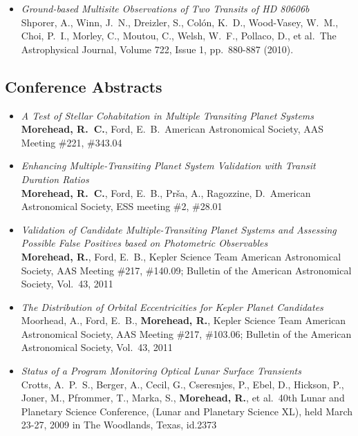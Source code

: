 \documentclass[12pt,letterpaper,sans]{moderncv} %
\begin{document}
\begin{itemize}
 \item \emph{ Ground-based Multisite Observations of Two Transits of HD 
80606b } \\ Shporer, A., Winn, J.~N., Dreizler, S., Col{\'o}n, K.~D., 
Wood-Vasey, W.~M., Choi, P.~I., Morley, C., Moutou, C., Welsh, W.~F., 
Pollaco, D., et al.\ The Astrophysical Journal, Volume 722, Issue 1, 
pp.~880-887 (2010).\ \\ 


\end{itemize}

\newpage
\subsection{Conference Abstracts}
\begin{itemize}
 \item \emph{ A Test of Stellar Cohabitation in Multiple Transiting 
Planet Systems } \\ \textbf{Morehead, R.~C.}, Ford, E.~B.\ American Astronomical 
Society, AAS Meeting \#221, \#343.04 \\ 


 \item \emph{ Enhancing Multiple-Transiting Planet System Validation with 
Transit Duration Ratios } \\ \textbf{Morehead, R.~C.}, Ford, E.~B., Pr{\v s}a, A., 
Ragozzine, D.\ American Astronomical Society, ESS meeting \#2, \#28.01 \\ 


 \item \emph{ Validation of Candidate Multiple-Transiting Planet Systems 
and Assessing Possible False Positives based on Photometric Observables } 
\\ \textbf{Morehead, R.}, Ford, E.~B., Kepler Science Team American Astronomical 
Society, AAS Meeting \#217, \#140.09; Bulletin of the American 
Astronomical Society, Vol.~43, 2011 \\ 

 \item \emph{ The Distribution of Orbital Eccentricities for Kepler 
Planet Candidates } \\ Moorhead, A., Ford, E.~B., \textbf{Morehead, R.}, Kepler 
Science Team American Astronomical Society, AAS Meeting \#217, \#103.06; 
Bulletin of the American Astronomical Society, Vol.~43, 2011 \\ 

 \item \emph{ Status of a Program Monitoring Optical Lunar Surface 
Transients } \\ Crotts, A.~P.~S., Berger, A., Cecil, G., Cseresnjes, P., 
Ebel, D., Hickson, P., Joner, M., Pfrommer, T., Marka, S., \textbf{ Morehead, R.}, et 
al.\ 40th Lunar and Planetary Science Conference, (Lunar and Planetary 
Science XL), held March 23-27, 2009 in The Woodlands, Texas, id.2373 \\ 
\end{itemize}
\end{document}
